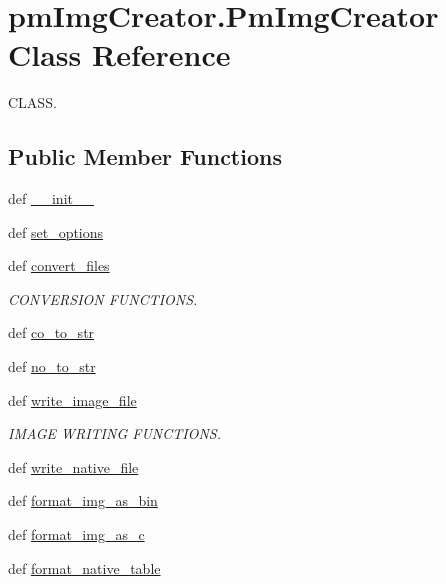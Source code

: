 \hypertarget{classpm_img_creator_1_1_pm_img_creator}{\section{pm\-Img\-Creator.\-Pm\-Img\-Creator Class Reference}
\label{classpm_img_creator_1_1_pm_img_creator}
}


C\-L\-A\-S\-S.  


\subsection*{Public Member Functions}
\begin{DoxyCompactItemize}
\item 
def \hyperlink{classpm_img_creator_1_1_pm_img_creator_a372887f5ebad1b50b2ef83fc7963b9d0}{\-\_\-\-\_\-init\-\_\-\-\_\-}
\item 
def \hyperlink{classpm_img_creator_1_1_pm_img_creator_a410e2018593996ae2ad4ccb4c3e2ea17}{set\-\_\-options}
\item 
def \hyperlink{classpm_img_creator_1_1_pm_img_creator_a4a9592f7f01ceff7e80bb91b937ca20d}{convert\-\_\-files}
\begin{DoxyCompactList}\small\item\em C\-O\-N\-V\-E\-R\-S\-I\-O\-N F\-U\-N\-C\-T\-I\-O\-N\-S. \end{DoxyCompactList}\item 
def \hyperlink{classpm_img_creator_1_1_pm_img_creator_af408929ab4dbeaf6a4ef72504c7769ce}{co\-\_\-to\-\_\-str}
\item 
def \hyperlink{classpm_img_creator_1_1_pm_img_creator_a6dbaff00e7c4ae108b57ab4136e35744}{no\-\_\-to\-\_\-str}
\item 
def \hyperlink{classpm_img_creator_1_1_pm_img_creator_af81e24eefd877a21091fefa8c5d73e3d}{write\-\_\-image\-\_\-file}
\begin{DoxyCompactList}\small\item\em I\-M\-A\-G\-E W\-R\-I\-T\-I\-N\-G F\-U\-N\-C\-T\-I\-O\-N\-S. \end{DoxyCompactList}\item 
def \hyperlink{classpm_img_creator_1_1_pm_img_creator_a31735bbda9167d380337ff7f0b526561}{write\-\_\-native\-\_\-file}
\item 
def \hyperlink{classpm_img_creator_1_1_pm_img_creator_a3abc850edad256cd37cae97ca0e87c92}{format\-\_\-img\-\_\-as\-\_\-bin}
\item 
def \hyperlink{classpm_img_creator_1_1_pm_img_creator_a3f84d5a474d63995b68be9894d92b0d8}{format\-\_\-img\-\_\-as\-\_\-c}
\item 
def \hyperlink{classpm_img_creator_1_1_pm_img_creator_a944065f250e4e68caaf9daf0a1a5a85e}{format\-\_\-native\-\_\-table}
\end{DoxyCompactItemize}
